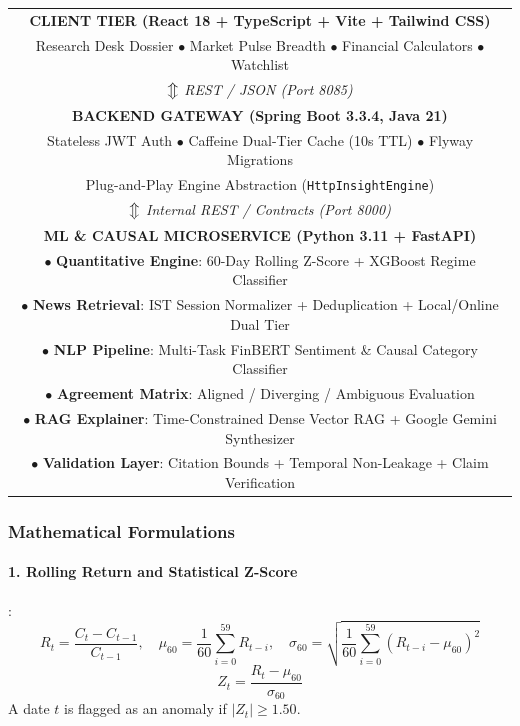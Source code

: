 \documentclass{article}
\begin{document}
	\begin{center}
	\begin{tabular}{|c|}
	\hline
	\textbf{CLIENT TIER (React 18 + TypeScript + Vite + Tailwind CSS)} \\
	Research Desk Dossier $\bullet$ Market Pulse Breadth $\bullet$ Financial Calculators $\bullet$ Watchlist \\
	\hline
	$\big\Updownarrow$ \textit{REST / JSON (Port 8085)} \\
	\hline
	\textbf{BACKEND GATEWAY (Spring Boot 3.3.4, Java 21)} \\
	Stateless JWT Auth $\bullet$ Caffeine Dual-Tier Cache (10s TTL) $\bullet$ Flyway Migrations \\
	Plug-and-Play Engine Abstraction (\texttt{HttpInsightEngine}) \\
	\hline
	$\big\Updownarrow$ \textit{Internal REST / Contracts (Port 8000)} \\
	\hline
	\textbf{ML \& CAUSAL MICROSERVICE (Python 3.11 + FastAPI)} \\
	$\bullet$ \textbf{Quantitative Engine}: 60-Day Rolling Z-Score + XGBoost Regime Classifier \\
	$\bullet$ \textbf{News Retrieval}: IST Session Normalizer + Deduplication + Local/Online Dual Tier \\
	$\bullet$ \textbf{NLP Pipeline}: Multi-Task FinBERT Sentiment \& Causal Category Classifier \\
	$\bullet$ \textbf{Agreement Matrix}: Aligned / Diverging / Ambiguous Evaluation \\
	$\bullet$ \textbf{RAG Explainer}: Time-Constrained Dense Vector RAG + Google Gemini Synthesizer \\
	$\bullet$ \textbf{Validation Layer}: Citation Bounds + Temporal Non-Leakage + Claim Verification \\
	\hline
	\end{tabular}
	\end{center}

	\subsubsection{Mathematical Formulations}
	\paragraph{1. Rolling Return and Statistical Z-Score}:
	\begin{equation}
		R_t = \frac{C_t - C_{t-1}}{C_{t-1}}, \quad \mu_{60} = \frac{1}{60}\sum_{i=0}^{59} R_{t-i}, \quad \sigma_{60} = \sqrt{\frac{1}{60}\sum_{i=0}^{59}(R_{t-i} - \mu_{60})^2}
	\end{equation}
	\begin{equation}
		Z_t = \frac{R_t - \mu_{60}}{\sigma_{60}}
	\end{equation}
	A date $t$ is flagged as an anomaly if $|Z_t| \ge 1.50$.
\end{document}
